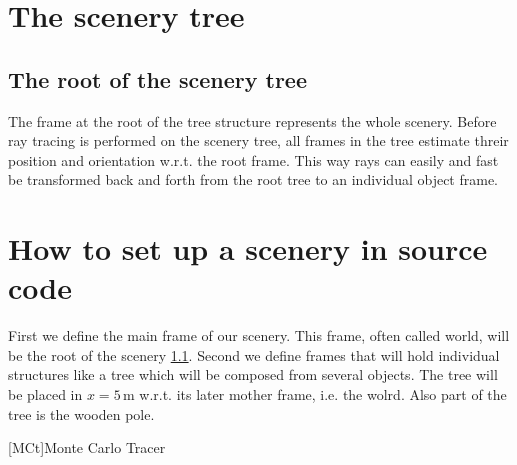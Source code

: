 \documentclass[review]{elsarticle}
\begin{document}
\section{The scenery tree}
\subsection{The root of the scenery tree}
\label{SubSecRootFrame}
The frame at the root of the tree structure represents the whole scenery.
%
Before ray tracing is performed on the scenery tree, all frames in the tree estimate threir position and orientation w.r.t. the root frame.
%
This way rays can easily and fast be transformed back and forth from the root tree to an individual object frame.
\section{How to set up a scenery in source code}
%
First we define the main frame of our scenery. This frame, often called world, will be the root of the scenery \ref{SubSecRootFrame}. 
%
%
Second we define frames that will hold individual structures like a tree which will be composed from several objects. The tree will be placed in $x=5\,$m w.r.t. its later mother frame, i.e. the wolrd. 
%
Also part of the tree is the wooden pole.

\begin{acronym}
    [MCt]{Monte Carlo Tracer}
\end{acronym}
\end{document}

